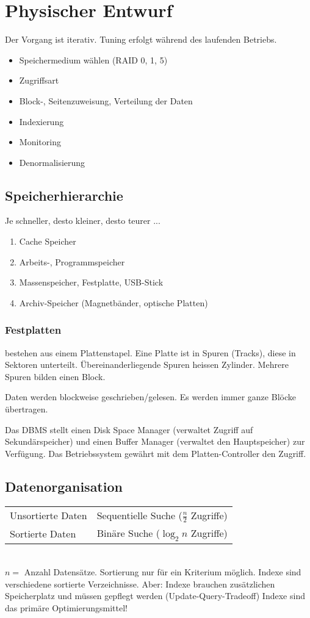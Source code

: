 \section{Physischer Entwurf}
Der Vorgang ist iterativ. Tuning erfolgt während des laufenden Betriebs.

\begin{itemize}\itemsep0em
	\item Speichermedium wählen (RAID 0, 1, 5)
	\item Zugriffsart
	\item Block-, Seitenzuweisung, Verteilung der Daten
	\item Indexierung
	\item Monitoring
	\item Denormalisierung
\end{itemize}

\subsection{Speicherhierarchie}
Je schneller, desto kleiner, desto teurer ...
\begin{enumerate}\itemsep0em
	\item Cache Speicher
	\item Arbeits-, Programmspeicher
	\item Massenspeicher, Festplatte, USB-Stick
	\item Archiv-Speicher (Magnetbänder, optische Platten)
\end{enumerate}

\subsubsection{Festplatten}
bestehen aus einem Plattenstapel. Eine Platte ist in Spuren (Tracks), diese in Sektoren unterteilt. 
Übereinanderliegende Spuren heissen Zylinder. Mehrere Spuren bilden einen Block.

Daten werden blockweise geschrieben/gelesen. Es werden immer ganze Blöcke übertragen.

Das DBMS stellt einen Disk Space Manager (verwaltet Zugriff auf Sekundärspeicher) und einen Buffer Manager
(verwaltet den Hauptspeicher) zur Verfügung. Das Betriebssystem gewährt mit dem Platten-Controller den Zugriff.

\subsection{Datenorganisation}
\settowidth{\MyLenA}{Unsortierte Daten~~}
\begin{tabular}{
	@{}p{\the\MyLenA}%
	@{}p{\linewidth-\the\MyLenA}}
	Unsortierte Daten & Sequentielle Suche ($\frac{n}{2}$ Zugriffe)\\
	Sortierte Daten & Binäre Suche ($\log_2 n$ Zugriffe)\\
\end{tabular}\\
$n =$ Anzahl Datensätze. Sortierung nur für ein Kriterium möglich. Indexe sind verschiedene sortierte Verzeichnisse.
Aber: Indexe brauchen zusätzlichen Speicherplatz und müssen gepflegt werden (Update-Query-Tradeoff)
Indexe sind das primäre Optimierungsmittel!

